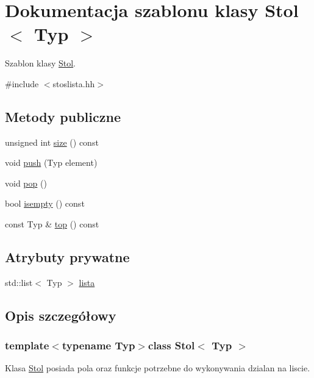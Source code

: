 \hypertarget{class_stol}{\section{Dokumentacja szablonu klasy Stol$<$ Typ $>$}
\label{class_stol}
}


Szablon klasy \hyperlink{class_stol}{Stol}.  




{\ttfamily \#include $<$stoslista.\-hh$>$}

\subsection*{Metody publiczne}
\begin{DoxyCompactItemize}
\item 
unsigned int \hyperlink{class_stol_a0fe3754424071aaa5a8bcd45fd145c5b}{size} () const 
\item 
void \hyperlink{class_stol_a6a92606f32fb4bed2261b7ca5e192e4c}{push} (Typ element)
\item 
void \hyperlink{class_stol_ab6de7dccb1eb7324c8a9b866fc557ed6}{pop} ()
\item 
bool \hyperlink{class_stol_ab4ffd8ef21aefe4966b65ba923b0b780}{isempty} () const 
\item 
const Typ \& \hyperlink{class_stol_a347f84a10b44bc97af0d6f77643cd45a}{top} () const 
\end{DoxyCompactItemize}
\subsection*{Atrybuty prywatne}
\begin{DoxyCompactItemize}
\item 
std\-::list$<$ Typ $>$ \hyperlink{class_stol_a1684a3d6a3801a6e4ea2ade79e634ea2}{lista}
\end{DoxyCompactItemize}


\subsection{Opis szczegółowy}
\subsubsection*{template$<$typename Typ$>$class Stol$<$ Typ $>$}

Klasa \hyperlink{class_stol}{Stol} posiada pola oraz funkcje potrzebne do wykonywania dzialan na liscie. 

